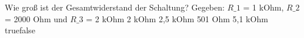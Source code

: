    {Wie groß ist der Gesamtwiderstand der Schaltung? Gegeben: $R\_1$ = 1 kOhm, $R\_2$ = 2000 Ohm und $R\_3$ = 2 kOhm}
    {2 kOhm}
    {2,5 kOhm}
    {501 Ohm}
    {5,1 kOhm}
    {true}{false}